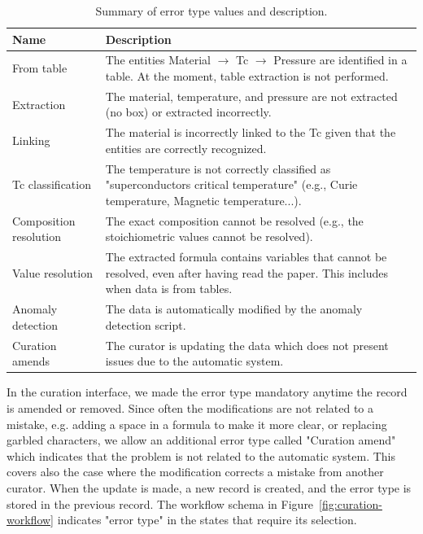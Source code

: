 \documentclass[a4paper]{article}
\begin{document}
\begin{table}[htbp]
\centering
\begin{tabular}{lp{8cm}}
\toprule
\textbf{Name} & \textbf{Description} \\
\midrule
From table & The entities Material $\rightarrow$ Tc $\rightarrow$ Pressure are identified in a table. At the moment, table extraction is not performed. \\
Extraction & The material, temperature, and pressure are not extracted (no box) or extracted incorrectly. \\
Linking & The material is incorrectly linked to the Tc given that the entities are correctly recognized. \\
Tc classification & The temperature is not correctly classified as "superconductors critical temperature" (e.g., Curie temperature, Magnetic temperature...). \\
Composition resolution & The exact composition cannot be resolved (e.g., the stoichiometric values cannot be resolved). \\
Value resolution & The extracted formula contains variables that cannot be resolved, even after having read the paper. This includes when data is from tables. \\
Anomaly detection & The data is automatically modified by the anomaly detection script. \\
Curation amends & The curator is updating the data which does not present issues due to the automatic system. \\
\bottomrule
\end{tabular}
\caption{Summary of error type values and description.}
\label{tab:error-types}
\end{table}

In the curation interface, we made the error type mandatory anytime the record is amended or removed. 
Since often the modifications are not related to a mistake, e.g. adding a space in a formula to make it more clear, or replacing garbled characters, we allow an additional error type called "Curation amend" which indicates that the problem is not related to the automatic system. This covers also the case where the modification corrects a mistake from another curator. 
When the update is made, a new record is created, and the error type is stored in the previous record. The workflow schema in Figure~\ref{fig:curation-workflow} indicates "error type" in the states that require its selection. 
\end{document}
